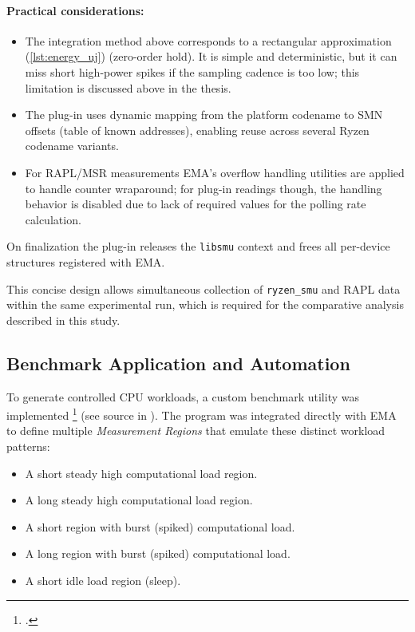 \paragraph{Practical considerations:}
\label{para:practical}
\begin{itemize}
  \item The integration method above corresponds to a rectangular
    approximation (\cref{lst:energy_uj}) (zero-order hold). It is simple and
    deterministic, but it can miss short high-power spikes if the sampling
    cadence is too low; this limitation is discussed above in the thesis.
  \item The plug-in uses dynamic mapping from the platform codename to
    \gls{SMN} offsets (table of known addresses), enabling reuse across
    several Ryzen codename variants.
  \item For \gls{RAPL}/\gls{MSR} measurements \gls{EMA}'s overflow handling
    utilities are applied to handle counter wraparound; for plug-in readings 
    though, the handling behavior is disabled due to lack of required values
    for the polling rate calculation.
\end{itemize}

On finalization the plug-in releases the \texttt{libsmu} context and
frees all per-device structures registered with \gls{EMA}.

This concise design allows simultaneous collection of \texttt{ryzen\_smu} and
\gls{RAPL} data within the same experimental run, which is required for the
comparative analysis described in this study.

\subsection{Benchmark Application and Automation}

To generate controlled \gls{CPU} workloads, a custom benchmark utility was
implemented \footcite{yahdzhyiev2025repo} (see source in
). The program was integrated directly with \gls{EMA}
to define multiple \emph{Measurement Regions} that emulate these distinct
workload patterns:

\begin{itemize}
  \item A short steady high computational load region.
  \item A long steady high computational load region.
  \item A short region with burst (spiked) computational load.
  \item A long region with burst (spiked) computational load.
  \item A short idle load region (sleep).
\end{itemize}

